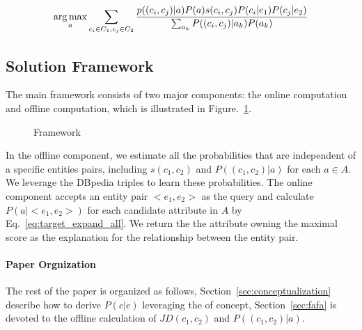 \begin{equation}
\label{eq:target_expand_all}
\begin{split}
 \operatorname*{arg\,max}_a \sum_{c_i\in C_1, c_j\in C_2}\frac{ p((c_{i},c_{j})|a) P(a) s(c_i,c_j) P(c_i|e_1) P(c_j|e_2) }{ \sum_{a_k}{P( (c_{i},c_{j})|a_k) P(a_k)   } }
\end{split}
\end{equation}



\subsection{Solution Framework}
The main framework consists of two major components: the online computation and offline computation, which is illustrated in Figure.~\ref{fig:framework}.

\begin{figure}[!hptb]
\label{fig:framework}
\centering
{}
\caption{Framework }
\end{figure}


In the offline component, we estimate all the probabilities that are independent of a specific entities pairs, including $s(c_1,c_2)$ and $P((c_{1},c_{2})|a)$ for each $a\in A$.
We leverage the DBpedia triples to learn these probabilities.
The online component accepts an entity pair $<e_1, e_2>$ as the query and calculate $ P(a| <e_1,e_2> )$ for each candidate attribute in $A$ by Eq.~\ref{eq:target_expand_all}. We return the the attribute owning the maximal score as the explanation for the relationship between the entity pair.




\paragraph{Paper Orgnization}
The rest of the paper is organized as follows, Section~\ref{sec:conceptualization} describe how to derive $P(c|e)$ leveraging the  of concept, Section~\ref{sec:fafa} is devoted to the offline calculation of $JD(c_1,c_2)$ and $P((c_{1},c_{2})|a)$.


